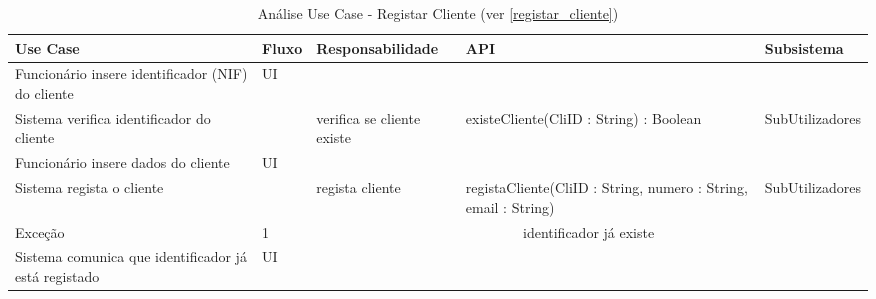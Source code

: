 \documentclass[../relatorio.tex]{subfiles}
\begin{document}
\begin{landscape}
    \begin{table}[!h]
        \centering
        \begin{tabular}{|p{5cm}|p{1cm}|p{4cm}|p{6cm}|p{3cm}|}
            \hline
            \rowcolor{gray!20!white}
            Use Case & Fluxo                                            & Responsabilidade & API & Subsistema \\
            \hline
            \rowcolor{yellow}
            Funcionário insere identificador (NIF) do cliente
                     & UI
                     & 
                     & 
                     & 
            \\
            \hline
            Sistema verifica identificador do cliente
                     & 
                     & verifica se cliente existe
                     & existeCliente(CliID : String) : Boolean
                     & SubUtilizadores
            \\
            \hline
            \rowcolor{yellow}
            Funcionário insere dados do cliente
                     & UI
                     & 
                     & 
                     & 
            \\
            \hline
            Sistema regista o cliente
                     & 
                     & regista cliente
                     & registaCliente(CliID : String, numero : String, email : String)
                     & SubUtilizadores
            \\
            \hline
            \rowcolor{red!30}
            Exceção  & 1                                                 &  \multicolumn{3}{c}{identificador já existe}\\
            \hline
            Sistema comunica que identificador já está registado
                     & UI
                     & 
                     & 
                     & 
            \\
            \hline
        \end{tabular}
        \caption{Análise Use Case - Registar Cliente (ver \ref{registar_cliente})}
    \end{table}
\end{landscape}
\end{document}
